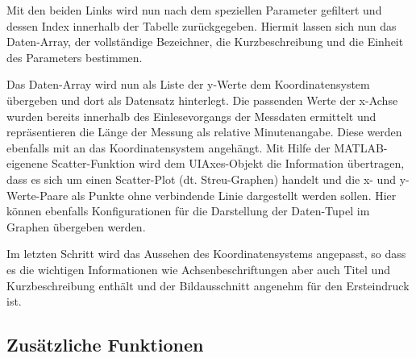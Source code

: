 Mit den beiden Links wird nun nach dem speziellen Parameter gefiltert und dessen Index innerhalb der Tabelle zurückgegeben. Hiermit lassen sich nun das Daten-Array, der vollständige Bezeichner, die Kurzbeschreibung und die Einheit des Parameters bestimmen. 



Das Daten-Array wird nun als Liste der y-Werte dem Koordinatensystem übergeben und dort als Datensatz hinterlegt. Die passenden Werte der x-Achse wurden bereits innerhalb des Einlesevorgangs der Messdaten ermittelt und repräsentieren die Länge der Messung als relative Minutenangabe. Diese werden ebenfalls mit an das Koordinatensystem angehängt. Mit Hilfe der MATLAB-eigenene Scatter-Funktion wird dem UIAxes-Objekt die Information übertragen, dass es sich um einen Scatter-Plot (dt. Streu-Graphen) handelt und die x- und y-Werte-Paare als Punkte ohne verbindende Linie dargestellt werden sollen. Hier können ebenfalls Konfigurationen für die Darstellung der Daten-Tupel im Graphen übergeben werden.



Im letzten Schritt wird das Aussehen des Koordinatensystems angepasst, so dass es die wichtigen Informationen wie Achsenbeschriftungen aber auch Titel und Kurzbeschreibung enthält und der Bildausschnitt angenehm für den Ersteindruck ist.

\subsection{Zusätzliche Funktionen}


